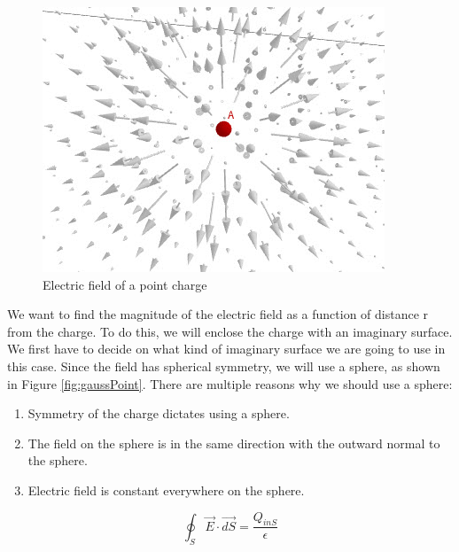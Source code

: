 \documentclass{ximera}
\begin{document}
\begin{figure}[h!]
\begin{center}
\includegraphics[scale=1]{../jpg/pointChargeField.jpg}
\end{center}
\caption{Electric field of a point charge}
\label{fig:eField}
\end{figure}




We want to find the magnitude of the electric field as a function of distance r from the charge. To do this, we will enclose the charge with an imaginary surface. We first have to decide on what kind of imaginary surface we are going to use in this case. Since the field has spherical symmetry, we will use a sphere, as shown in Figure \ref{fig:gaussPoint}. There are multiple reasons why we should use a sphere:

\begin{enumerate}
\item Symmetry of the charge dictates using a sphere.
\item The field on the sphere is in the same direction with the outward normal to the sphere.
\item Electric field is constant everywhere on the sphere.
\end{enumerate}




\begin{equation}
\oint_S \vec{E} \cdot \vec{dS} = \frac{Q_{inS}}{\epsilon}
\end{equation}
\end{document}
